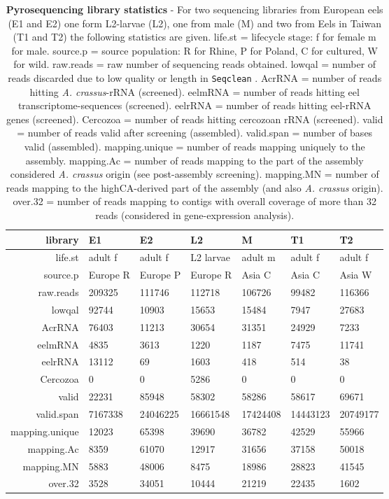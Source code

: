 \begin{table}[!h]
\begin{tabular}{rllllll}
   \hline
library & E1 & E2 & L2 & M & T1 & T2 \\ 
   \hline
life.st & adult f & adult f & L2 larvae & adult m & adult f & adult f \\ 
  source.p & Europe R & Europe P & Europe R & Asia C & Asia C & Asia W \\ 
  raw.reads & 209325 & 111746 & 112718 & 106726 & 99482 & 116366 \\ 
  lowqal & 92744 & 10903 & 15653 & 15484 & 7947 & 27683 \\ 
  AcrRNA & 76403 & 11213 & 30654 & 31351 & 24929 & 7233 \\ 
  eelmRNA & 4835 & 3613 & 1220 & 1187 & 7475 & 11741 \\ 
  eelrRNA & 13112 & 69 & 1603 & 418 & 514 & 38 \\ 
  Cercozoa & 0 & 0 & 5286 & 0 & 0 & 0 \\ 
  valid & 22231 & 85948 & 58302 & 58286 & 58617 & 69671 \\ 
  valid.span & 7167338 & 24046225 & 16661548 & 17424408 & 14443123 & 20749177 \\ 
  mapping.unique & 12023 & 65398 & 39690 & 36782 & 42529 & 55966 \\ 
  mapping.Ac &  8359 & 61070 & 12917 & 31656 & 37158 & 50018 \\ 
  mapping.MN &  5883 & 48006 &  8475 & 18986 & 28823 & 41545 \\ 
  over.32 &  3528 & 34051 & 10444 & 21219 & 22435 & 1602 \\ 
  \hline
\end{tabular}
\caption[Pyrosequencing library statistics]{
  \textbf{Pyrosequencing library statistics} - 
  For two sequencing libraries from European eels (E1 and E2)
  one form L2-larvae (L2), one from male (M) and two from Eels in Taiwan
  (T1 and T2) the following statistics are given. life.st = lifecycle
  stage: f for female m for male. source.p = source population: R for
  Rhine, P for Poland, C for cultured, W for wild. raw.reads = raw
  number of sequencing reads obtained. lowqal = number of reads
  discarded due to low quality or length in \texttt{Seqclean}
  \cite{tgicl_pertea}. AcrRNA = number of reads hitting
  \textit{A. crassus}-rRNA (screened). eelmRNA = number of reads hitting
  eel transcriptome-sequences (screened). eelrRNA = number of reads
  hitting eel-rRNA genes (screened). Cercozoa = number of reads hitting
  cercozoan rRNA (screened). valid = number of reads valid after
  screening (assembled). valid.span = number of bases valid (assembled).
  mapping.unique = number of reads mapping uniquely to the
  assembly. mapping.Ac = number of reads mapping to the part of the
  assembly considered \textit{A. crassus} origin (see post-assembly
  screening). mapping.MN = number of reads mapping to the highCA-derived
  part of the assembly (and also \textit{A. crassus} origin). over.32 =
  number of reads mapping to contigs with overall coverage of more than
  32 reads (considered in gene-expression analysis).}
  \label{screening-lib}
\end{table}

